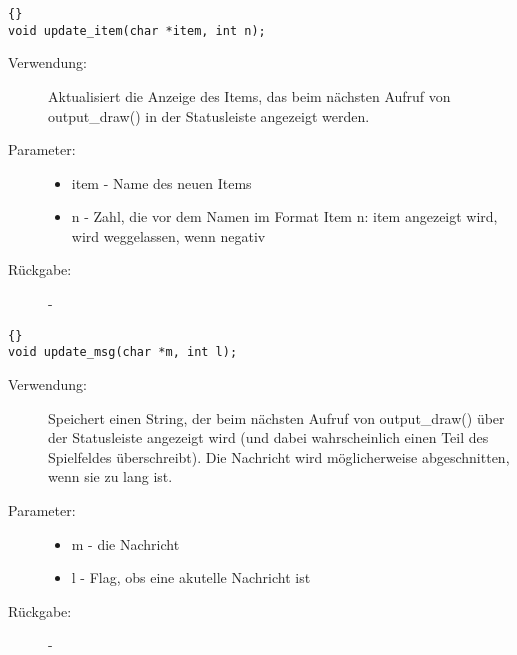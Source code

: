 \documentclass[11pt,a4paper,notitlepage]{report}
\begin{document}
		\begin{lstlisting}[caption=update\_item]{}
void update_item(char *item, int n);
		\end{lstlisting}

	\begin{description}
		\item[Verwendung:] Aktualisiert die Anzeige des Items, das beim nächsten Aufruf von output\_draw() in der Statusleiste angezeigt werden.
		\item[Parameter:] \hfill
		\begin{itemize}
			\item item - Name des neuen Items
			\item n - Zahl, die vor dem Namen im Format Item n: item angezeigt wird, wird weggelassen, wenn negativ
		\end{itemize}
		\item[Rückgabe:] -
	\end{description}
		
		\begin{lstlisting}[caption=update\_msg]{}
void update_msg(char *m, int l);
		\end{lstlisting}

	\begin{description}
		\item[Verwendung:] Speichert einen String, der beim nächsten Aufruf von output\_draw() über der Statusleiste angezeigt wird (und dabei wahrscheinlich
			einen Teil des Spielfeldes überschreibt). Die Nachricht wird möglicherweise abgeschnitten, wenn sie zu lang ist.
		\item[Parameter:] \hfill
		\begin{itemize}
			\item m - die Nachricht
			\item l - Flag, obs eine akutelle Nachricht ist
		\end{itemize}
		\item[Rückgabe:] -
	\end{description}



	\newpage
\end{document}
